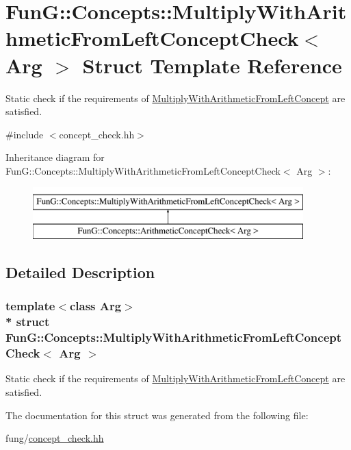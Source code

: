 \hypertarget{structFunG_1_1Concepts_1_1MultiplyWithArithmeticFromLeftConceptCheck}{}\section{FunG\+:\+:Concepts\+:\+:Multiply\+With\+Arithmetic\+From\+Left\+Concept\+Check$<$ Arg $>$ Struct Template Reference}
\label{structFunG_1_1Concepts_1_1MultiplyWithArithmeticFromLeftConceptCheck}


Static check if the requirements of \hyperlink{structFunG_1_1Concepts_1_1MultiplyWithArithmeticFromLeftConcept}{Multiply\+With\+Arithmetic\+From\+Left\+Concept} are satisfied.  




{\ttfamily \#include $<$concept\+\_\+check.\+hh$>$}

Inheritance diagram for FunG\+:\+:Concepts\+:\+:Multiply\+With\+Arithmetic\+From\+Left\+Concept\+Check$<$ Arg $>$\+:\begin{figure}[H]
\begin{center}
\leavevmode
\includegraphics[height=2.000000cm]{structFunG_1_1Concepts_1_1MultiplyWithArithmeticFromLeftConceptCheck}
\end{center}
\end{figure}


\subsection{Detailed Description}
\subsubsection*{template$<$class Arg$>$\\*
struct Fun\+G\+::\+Concepts\+::\+Multiply\+With\+Arithmetic\+From\+Left\+Concept\+Check$<$ Arg $>$}

Static check if the requirements of \hyperlink{structFunG_1_1Concepts_1_1MultiplyWithArithmeticFromLeftConcept}{Multiply\+With\+Arithmetic\+From\+Left\+Concept} are satisfied. 

The documentation for this struct was generated from the following file\+:\begin{DoxyCompactItemize}
\item 
fung/\hyperlink{concept__check_8hh}{concept\+\_\+check.\+hh}\end{DoxyCompactItemize}
